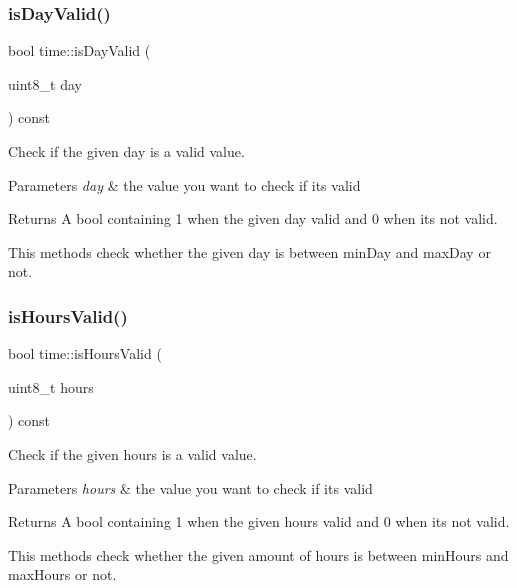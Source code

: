\subsubsection{\texorpdfstring{is\+Day\+Valid()}{isDayValid()}}
{\footnotesize\ttfamily bool time\+::is\+Day\+Valid (\begin{DoxyParamCaption}\item[{uint8\+\_\+t}]{day }\end{DoxyParamCaption}) const}



Check if the given day is a valid value. 


\begin{DoxyParams}{Parameters}
{\em day} & the value you want to check if it\textquotesingle{}s valid \\
\hline
\end{DoxyParams}
\begin{DoxyReturn}{Returns}
A bool containing 1 when the given day valid and 0 when it\textquotesingle{}s not valid.
\end{DoxyReturn}
This methods check whether the given day is between min\+Day and max\+Day or not. \mbox{\label{classtime_afe3fbaa007cbc8072b36c8bd2a556365}} 
\subsubsection{\texorpdfstring{is\+Hours\+Valid()}{isHoursValid()}}
{\footnotesize\ttfamily bool time\+::is\+Hours\+Valid (\begin{DoxyParamCaption}\item[{uint8\+\_\+t}]{hours }\end{DoxyParamCaption}) const}



Check if the given hours is a valid value. 


\begin{DoxyParams}{Parameters}
{\em hours} & the value you want to check if it\textquotesingle{}s valid \\
\hline
\end{DoxyParams}
\begin{DoxyReturn}{Returns}
A bool containing 1 when the given hours valid and 0 when it\textquotesingle{}s not valid.
\end{DoxyReturn}
This methods check whether the given amount of hours is between min\+Hours and max\+Hours or not. \mbox{\label{classtime_adafa6fb7a20aee5e865a51576ab9340b}} 
